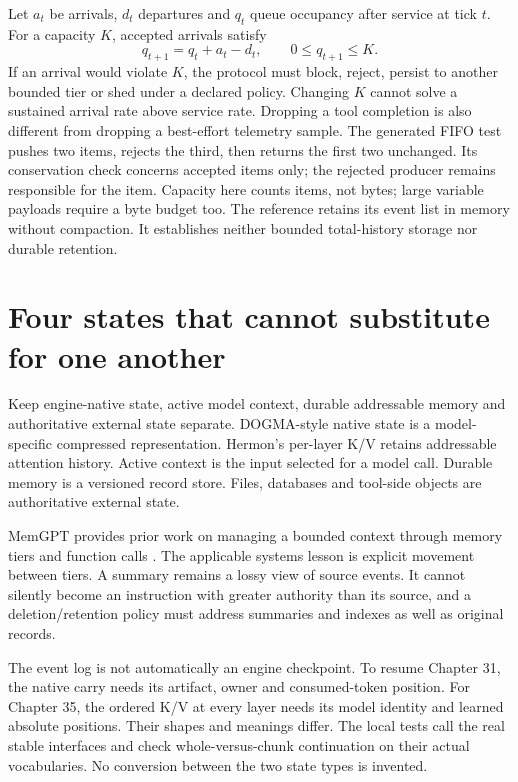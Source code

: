 Let $a_t$ be arrivals, $d_t$ departures and $q_t$ queue occupancy after service
at tick $t$. For a capacity $K$, accepted arrivals satisfy
\[
q_{t+1}=q_t+a_t-d_t,\qquad 0\le q_{t+1}\le K.
\]
If an arrival would violate $K$, the protocol must block, reject, persist to
another bounded tier or shed under a declared policy. Changing $K$ cannot solve
a sustained arrival rate above service rate. Dropping a tool completion is also
different from dropping a best-effort telemetry sample.
The generated FIFO test pushes two items, rejects the third, then returns
the first two unchanged. Its conservation check concerns accepted items only;
the rejected producer remains responsible for the item.
Capacity here counts items, not bytes; large variable payloads require a byte
budget too. The reference retains its event list in memory without compaction.
It establishes neither bounded total-history storage nor durable retention.


\section{Four states that cannot substitute for one another}
Keep engine-native state, active model context, durable addressable memory
and authoritative external state separate. DOGMA-style native state is a
model-specific compressed representation. Hermon's per-layer K/V retains
addressable attention history. Active context is the input selected for a
model call. Durable memory is a versioned record store. Files, databases and
tool-side objects are authoritative external state.

MemGPT provides prior work on managing a bounded context through memory tiers
and function calls \cite{evod49:memgpt}. The applicable systems lesson is
explicit movement between tiers. A summary remains a lossy view of source
events. It cannot silently become an instruction with greater authority than
its source, and a deletion/retention policy must address summaries and indexes
as well as original records.

The event log is not automatically an engine checkpoint. To resume Chapter 31,
the native carry needs its artifact, owner and consumed-token position. For
Chapter 35, the ordered K/V at every layer needs its model identity and learned
absolute positions. Their shapes and meanings differ. The local tests call
the real stable interfaces and check whole-versus-chunk continuation on their
actual vocabularies. No conversion between the two state types is invented.


